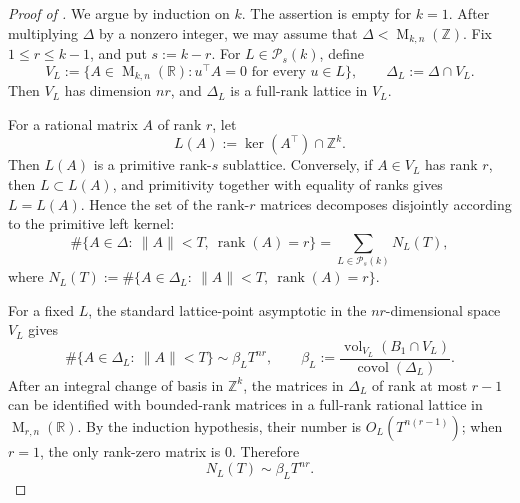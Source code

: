 \documentclass[reqno,11pt]{amsart}
\numberwithin{equation}{section}
\theoremstyle{definition}
\theoremstyle{remark}
\newcommand{\op}{\operatorname}
\newcommand{\rank}{\op{rank}}
\newcommand{\vol}{\op{vol}}
\newcommand{\M}{\op{M}}
\newcommand{\covol}{\op{covol}}
\begin{document}
\begin{proof}[Proof of ]
We argue by induction on $k$. The assertion is empty for $k=1$. After
multiplying $\Delta$ by a nonzero integer, we may assume that
$\Delta<\M_{k,n}(\mathbb Z)$. Fix $1\le r\le k-1$, and put $s:=k-r$. For
$L\in\mathcal P_s(k)$, define
\begin{equation}\label{vl}
V_L
:=
\{A\in\M_{k,n}(\mathbb R):u^{\intercal}A=0\text{ for every }u\in L\},
\qquad
\Delta_L:=\Delta\cap V_L.
\end{equation}
Then $V_L$ has dimension $nr$, and $\Delta_L$ is a full-rank lattice in
$V_L$.

For a rational matrix $A$ of rank $r$, let
$$
L(A):=\ker(A^{\intercal})\cap\mathbb Z^k.
$$
Then $L(A)$ is a primitive rank-$s$ sublattice. Conversely, if
$A\in V_L$ has rank $r$, then $L\subset L(A)$, and primitivity together
with equality of ranks gives $L=L(A)$. Hence the set of the rank-$r$ matrices
 decomposes disjointly according to the primitive left kernel:
\begin{equation}\label{eq:rank-kernel-decomposition}
\#\{A\in\Delta:\ \|A\|< T,\ \rank(A)=r\}
=
\sum_{L\in\mathcal P_s(k)}N_L(T),
\end{equation}
where
$N_L(T)
:=\#\{A\in\Delta_L:\ \|A\|< T,\ \rank(A)=r\}$.

For a fixed $L$, the standard lattice-point asymptotic in the
$nr$-dimensional space $V_L$ gives
$$
\#\{A\in\Delta_L:\ \|A\|< T\}
\sim
\beta_LT^{nr},
\qquad
\beta_L
:=
\frac{\vol_{V_L}(B_1\cap V_L)}{\covol(\Delta_L)}.
$$
After an
integral change of basis in $\mathbb Z^k$, the matrices in $\Delta_L$ of rank at most $r-1$ can be identified with bounded-rank matrices in a
full-rank rational lattice in $\M_{r,n}(\mathbb R)$. By the induction
hypothesis, their number is $O_L(T^{n(r-1)})$; when $r=1$, the only
rank-zero matrix is $0$. Therefore
\begin{equation}\label{eq:fixed-kernel-asymptotic}
N_L(T)
\sim
\beta_LT^{nr}.
\end{equation}


\end{proof}
\end{document}
